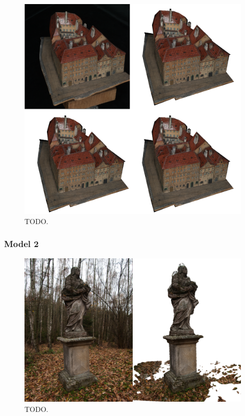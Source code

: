 \documentclass[11pt,twoside,a4paper]{book}
\begin{document}
\begin{figure}[h!]
\begin{center}
\includegraphics[width=\textwidth]{figures/test-7}
\caption{TODO.}
\label{fig:test-7}
\end{center}
\end{figure}

\subsubsection*{Model 2}

\begin{figure}[h]
\begin{center}
\includegraphics[width=\textwidth]{figures/test-6}
\caption{TODO.}
\label{fig:test-6}
\end{center}
\end{figure}
\end{document}
